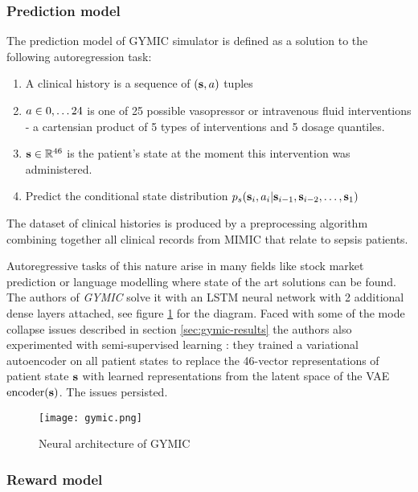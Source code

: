 \subsubsection{Prediction model}
The prediction model of GYMIC simulator is defined as a solution to the following autoregression task:
\begin{enumerate}
    \item A clinical history is a sequence of $(\textbf{s}, a)$ tuples
    \item $a \in 0,\dots 24$ is one of 25 possible vasopressor or intravenous fluid interventions - a cartensian product of 5 types of interventions and 5 dosage quantiles.
    \item $\textbf{s} \in \mathbb{R}^{46}$ is the patient's state at the moment this intervention was administered.
    \item Predict the conditional state distribution $p_s(\textbf{s}_i, a_i | \textbf{s}_{i-1},\textbf{s}_{i-2},\dots,\textbf{s}_1)$
\end{enumerate}

The dataset of clinical histories is produced by a preprocessing algorithm combining together all clinical records from MIMIC that relate to sepsis patients.

Autoregressive tasks of this nature arise in many fields like stock market prediction \cite{stonks1,stonks2} or language modelling \cite{langmodels} where state of the art solutions can be found.
The authors of \emph{GYMIC} solve it with an LSTM \cite{hochreiterLongShorttermMemory1997} neural network with 2 additional dense layers attached, see figure \ref{fig:gymic} for the diagram.
Faced with some of the mode collapse issues described in section \ref{sec:gymic-results} the authors also experimented with semi-supervised learning \cite{semi-supervised}: they trained a variational autoencoder \cite{vae} on all patient states to replace the 46-vector representations of patient state $\textbf{s}$ with learned representations from the latent space of the VAE $\text{encoder}(\textbf{s})$.
The issues persisted.

\begin{figure}
    \centering
    \texttt{[image: gymic.png]}
    \caption{Neural architecture of GYMIC}
    \label{fig:gymic}
\end{figure}

\subsubsection{Reward model}


